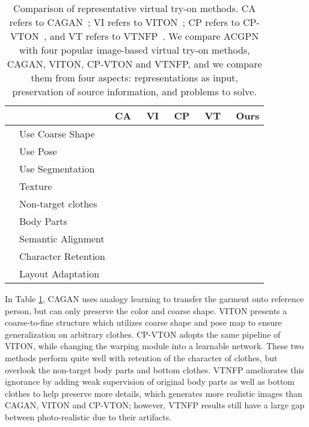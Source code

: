 \documentclass[10pt,twocolumn,letterpaper]{article}
\begin{document}
\begin{table}
\setlength{\baselineskip}{2em} \renewcommand\tabcolsep{1pt} \small
\begin{center}


\begin{tabular}{llccccc}
\hline
&&CA~\cite{DBLP:conf/iccvw/JetchevB17}&VI~\cite{DBLP:conf/cvpr/HanWWYD18}&CP~\cite{DBLP:conf/eccv/WangZLCLY18}&VT~\cite{Yu_2019_ICCV}&Ours\\
\hline\hline
\parbox[t]{2mm}{}&Use Coarse Shape&   &&&&\\
&Use Pose&  &&&&\\
&Use Segmentation&  &&&&\\
\hline

\parbox[t]{2mm}{}&Texture&  &&&&\\
&Non-target clothes&  &&&&\\
&Body Parts&  &&&&\\
\hline

\parbox[t]{2mm}{}&Semantic Alignment&  &&&&\\
&Character Retention&  &&&&\\
&Layout Adaptation&  &&&&\\

\hline
\end{tabular}
\vspace{10pt}

\caption{\footnotesize Comparison of representative virtual try-on methods. CA refers to CAGAN~\cite{DBLP:conf/iccvw/JetchevB17}; VI refers to VITON~\cite{DBLP:conf/cvpr/HanWWYD18}; CP refers to CP-VTON~\cite{DBLP:conf/eccv/WangZLCLY18}, and VT refers to VTNFP~\cite{Yu_2019_ICCV}. We compare ACGPN with four popular image-based virtual try-on methods, \ie CAGAN, VITON, CP-VTON and VTNFP, and we compare them from four aspects: representations as input, preservation of source information, and problems to solve.}
\label{tab:Overview}

\vspace{-20pt}

\end{center}
\end{table}



In Table \ref{tab:Overview}, CAGAN uses analogy learning to transfer the garment onto reference person, but can only preserve the color and coarse shape. VITON presents a coarse-to-fine structure which utilizes coarse shape and pose map to ensure generalization on arbitrary clothes. CP-VTON adopts the same pipeline of VITON, while changing the warping module into a learnable network. These two methods perform quite well with retention of the character of clothes, but overlook the non-target body parts and bottom clothes. VTNFP ameliorates this ignorance by adding weak supervision of original body parts as well as bottom clothes to help preserve more details, which generates more realistic images than CAGAN, VITON and CP-VTON; however, VTNFP results still have a large gap between photo-realistic due to their artifacts.
\end{document}
